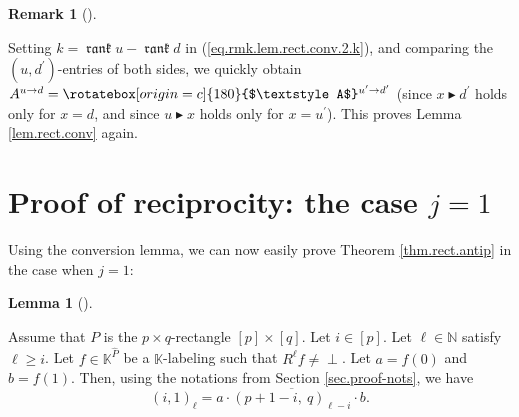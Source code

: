 \documentclass[numbers=enddot,12pt,final,onecolumn,notitlepage]{scrartcl}%
\theoremstyle{definition}
\newtheorem{lem}[theo]{Lemma}
\newenvironment{lemma}[1][]
{\begin{lem}[#1]\begin{leftbar}}
{\end{leftbar}\end{lem}}
\newtheorem{remk}[theo]{Remark}
\newenvironment{remark}[1][]
{\begin{remk}[#1]\begin{leftbar}}
{\end{leftbar}\end{remk}}
\newcommand{\undf}{\operatorname*{\bot}}
\newcommand{\upslack}{\mathchoice{\rotatebox[origin=c]{180}{$\displaystyle A$}}{\rotatebox[origin=c]{180}{$\textstyle A$}}{\rotatebox[origin=c]{180}{$\scriptstyle A$}}{\rotatebox[origin=c]{180}{$\scriptscriptstyle A$}}}
\newcommand{\downslack}{A}
\DeclareMathOperator{\rank}{\mathfrak{rank}}
\begin{document}
\begin{remark}
Setting $k=\rank u-\rank d$ in (\ref{eq.rmk.lem.rect.conv.2.k}), and comparing
the $\left(  u,d^{\prime}\right)  $-entries of both sides, we quickly obtain
$\downslack^{u\rightarrow d}=\upslack^{u^{\prime}\rightarrow d^{\prime}}$
(since $x\blacktriangleright d^{\prime}$ holds only for $x=d$, and since
$u\blacktriangleright x$ holds only for $x=u^{\prime}$). This proves Lemma
\ref{lem.rect.conv} again.
\end{remark}

\section{\label{sec.Rfi1}Proof of reciprocity: the case $j=1$}

Using the conversion lemma, we can now easily prove Theorem
\ref{thm.rect.antip} in the case when $j=1$:

\begin{lemma}
\label{lem.rect.i1}Assume that $P$ is the $p\times q$-rectangle $\left[
p\right]  \times\left[  q\right]  $. Let $i\in\left[  p\right]  $. Let
$\ell\in\mathbb{N}$ satisfy $\ell\geq i$. Let $f\in\mathbb{K}^{\widehat{P}}$
be a $\mathbb{K}$-labeling such that $R^{\ell}f\neq\undf$. Let $a=f\left(
0\right)  $ and $b=f\left(  1\right)  $. Then, using the notations from
Section \ref{sec.proof-nots}, we have%
\[
\left(  i,1\right)  _{\ell}=a\cdot\overline{\left(  p+1-i,\ q\right)
_{\ell-i}}\cdot b.
\]

\end{lemma}
\end{document}

